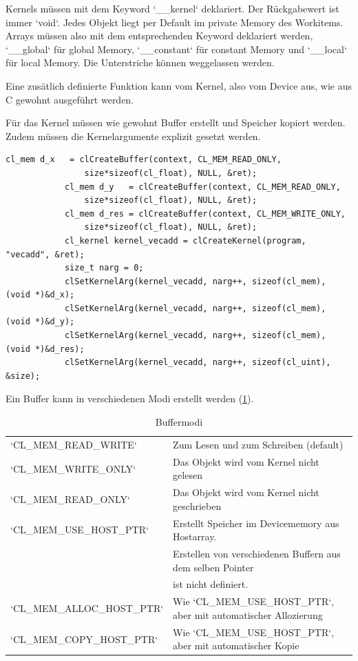             \Glspl{Kernel} müssen mit dem Keyword \li`__kernel` deklariert. Der Rückgabewert ist immer \li`void`. Jedes Objekt liegt per Default im \gls{private Memory} des \Glspl{Workitem}. Arrays müssen also mit dem entsprechenden Keyword deklariert werden, \li`__global` für \gls{global Memory}, \li`__constant` für \gls{constant Memory} und \li`__local` für \gls{local Memory}. Die Unterstriche können weggelassen werden. 
			
			Eine zusätlich definierte Funktion kann vom \Gls{Kernel}, also vom Device aus, wie aus C gewohnt ausgeführt werden. 
			
			Für das \Gls{Kernel} müssen wie gewohnt Buffer erstellt und Speicher kopiert werden. Zudem müssen die Kernelargumente explizit gesetzt werden.
			\begin{lstlisting}[caption=Kernelaufruf]
			cl_mem d_x   = clCreateBuffer(context, CL_MEM_READ_ONLY, 
				size*sizeof(cl_float), NULL, &ret);
			cl_mem d_y   = clCreateBuffer(context, CL_MEM_READ_ONLY, 
				size*sizeof(cl_float), NULL, &ret);
			cl_mem d_res = clCreateBuffer(context, CL_MEM_WRITE_ONLY, 
				size*sizeof(cl_float), NULL, &ret);			
			cl_kernel kernel_vecadd = clCreateKernel(program, "vecadd", &ret);		
			size_t narg = 0;
			clSetKernelArg(kernel_vecadd, narg++, sizeof(cl_mem),  (void *)&d_x);
			clSetKernelArg(kernel_vecadd, narg++, sizeof(cl_mem),  (void *)&d_y);
			clSetKernelArg(kernel_vecadd, narg++, sizeof(cl_mem),  (void *)&d_res);
			clSetKernelArg(kernel_vecadd, narg++, sizeof(cl_uint), &size);
			\end{lstlisting}
			
			Ein Buffer kann in verschiedenen Modi erstellt werden (\ref{tab4:flags}).
			\begin{table}[h]
				\centering
				\begin{tabular}{ll}\toprule
				    \li`CL_MEM_READ_WRITE` & Zum Lesen und zum Schreiben (default) \\
    			        	\li`CL_MEM_WRITE_ONLY` & Das Objekt wird vom \Gls{Kernel} nicht gelesen \\	
	        			\li`CL_MEM_READ_ONLY`  & Das Objekt wird vom \Gls{Kernel} nicht geschrieben \\
        				\li`CL_MEM_USE_HOST_PTR` & Erstellt Speicher im Devicememory aus Hostarray.\\
				                             & Erstellen von verschiedenen Buffern aus dem selben Pointer\\
		        		                         & ist nicht definiert.\\
        				\li`CL_MEM_ALLOC_HOST_PTR` & Wie \li`CL_MEM_USE_HOST_PTR`, aber mit automatischer Allozierung \\
		        		\li`CL_MEM_COPY_HOST_PTR`  & Wie \li`CL_MEM_USE_HOST_PTR`, aber mit automatischer Kopie\\ \bottomrule
				\end{tabular}
				\caption{Buffermodi}
				\label{tab4:flags}
			\end{table}
			
